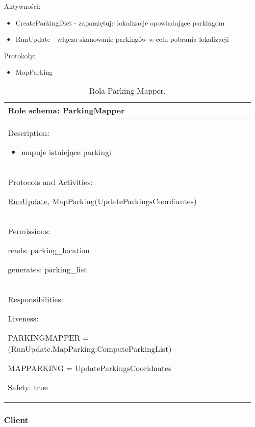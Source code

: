 Aktywności:
\begin{itemize}
    \item CreateParkingDict - zapamiętuje lokalizacje opowiadające parkingom 
    \item RunUpdate - włącza skanowanie parkingów w celu pobrania lokalizacji

\end{itemize}

Protokoły:
\begin{itemize}
    \item MapParking
\end{itemize}


\begin{table}[!h] \label{tab:rola1} \centering
    \caption{Rola Parking Mapper.}
    \begin{tabular} {| p{14cm} |} \hline
        Role schema: ParkingMapper \\ \hline
        Description:

        \begin{itemize}
            \item mapuje istniejące parkingi
        \end{itemize} \\ \hline
        Protocols and Activities: 
        
        \ul{RunUpdate}, MapParking(UpdateParkingsCoordiantes) \\ \hline
        Permissions:

        reads: parking\_location

        generates:  parking\_list                                                                                 \\ \hline
        Responsibilities:

        Liveness: 
        
        PARKINGMAPPER = (RunUpdate.MapParking.ComputeParkingList)

        MAPPARKING = UpdateParkingsCooridnates 
        

        Safety: true                                                                                                                \\ \hline
    \end{tabular}
\end{table}

\newpage
\subsubsection{Client}

